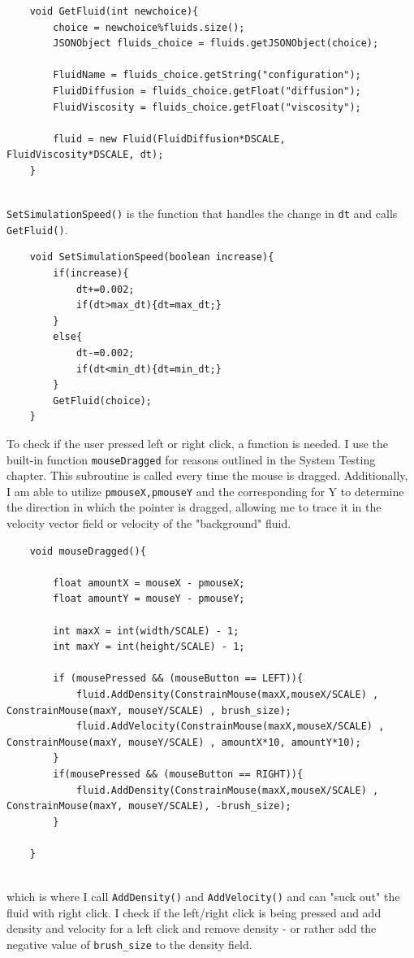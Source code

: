 \documentclass[12pt,a4paper]{book}
\begin{document}
\begin{lstlisting}
	void GetFluid(int newchoice){
		choice = newchoice%fluids.size();
		JSONObject fluids_choice = fluids.getJSONObject(choice);
		
		FluidName = fluids_choice.getString("configuration");
		FluidDiffusion = fluids_choice.getFloat("diffusion");
		FluidViscosity = fluids_choice.getFloat("viscosity");
		
		fluid = new Fluid(FluidDiffusion*DSCALE, FluidViscosity*DSCALE, dt);
	}
	
\end{lstlisting}

\verb|SetSimulationSpeed()| is the function that handles the change in \verb|dt| and calls \verb|GetFluid()|.
\begin{lstlisting}
	void SetSimulationSpeed(boolean increase){
		if(increase){
			dt+=0.002;
			if(dt>max_dt){dt=max_dt;}
		}
		else{
			dt-=0.002;
			if(dt<min_dt){dt=min_dt;}
		}
		GetFluid(choice);
	}
\end{lstlisting}
To check if the user pressed left or right click, a function is needed. I use the built-in function \verb|mouseDragged| for reasons outlined in the System Testing chapter. This subroutine is called every time the mouse is dragged. Additionally, I am able to utilize \verb|pmouseX,pmouseY| and the corresponding for Y to determine the direction in which the pointer is dragged, allowing me to trace it in the velocity vector field or velocity of the "background" fluid. 
\begin{lstlisting}
	void mouseDragged(){
		
		float amountX = mouseX - pmouseX;
		float amountY = mouseY - pmouseY;
		
		int maxX = int(width/SCALE) - 1;
		int maxY = int(height/SCALE) - 1;
		
		if (mousePressed && (mouseButton == LEFT)){
			fluid.AddDensity(ConstrainMouse(maxX,mouseX/SCALE) , ConstrainMouse(maxY, mouseY/SCALE) , brush_size);
			fluid.AddVelocity(ConstrainMouse(maxX,mouseX/SCALE) , ConstrainMouse(maxY, mouseY/SCALE) , amountX*10, amountY*10);
		}
		if(mousePressed && (mouseButton == RIGHT)){
			fluid.AddDensity(ConstrainMouse(maxX,mouseX/SCALE) , ConstrainMouse(maxY, mouseY/SCALE), -brush_size);
		}
		
	}
	
\end{lstlisting}
which is where I call \verb|AddDensity()| and \verb|AddVelocity()| and can "suck out" the fluid with right click. I check if the left/right click is being pressed and add density and velocity for a left click and remove density - or rather add the negative value of \verb|brush_size| to the density field.
\end{document}
